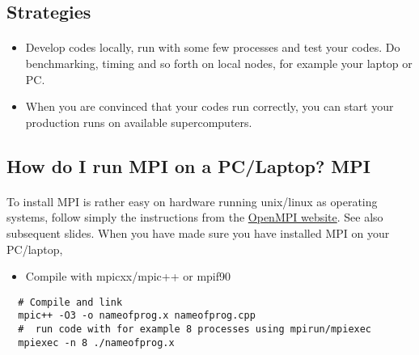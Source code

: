 \subsection*{Strategies}

\paragraph{}
\begin{itemize}
\item Develop codes locally, run with some few processes and test your codes.  Do benchmarking, timing and so forth on local nodes, for example your laptop or PC. 

\item When you are convinced that your codes run correctly, you can start your production runs on available supercomputers.
\end{itemize}

\noindent



\subsection*{How do I run MPI on a PC/Laptop? MPI}

\paragraph{}
To install MPI is rather easy on hardware running unix/linux as operating systems, follow simply the instructions from the \href{{https://www.open-mpi.org/}}{OpenMPI website}. See also subsequent slides.
When you have made sure you have installed MPI on your PC/laptop, 
\begin{itemize}
\item Compile with mpicxx/mpic++ or mpif90
\end{itemize}

\noindent





\begin{verbatim}
  # Compile and link
  mpic++ -O3 -o nameofprog.x nameofprog.cpp
  #  run code with for example 8 processes using mpirun/mpiexec
  mpiexec -n 8 ./nameofprog.x

\end{verbatim}



